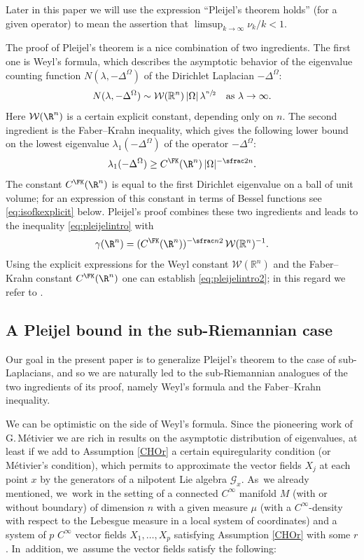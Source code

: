Later in this paper we will use the expression ``Pleijel's theorem holds'' (for a given operator) to mean the assertion that $\limsup_{k\to\infty} \nu_k/k<1$.

The proof of Pleijel's theorem is a nice combination of two ingredients. The first one is Weyl's formula, which describes the asymptotic behavior of the eigenvalue counting function $N(\lambda,-\Delta^\Omega)$ of the Dirichlet Laplacian $-\Delta^\Omega$:
\[
N(\lambda, -\Delta^\Omega) \sim \mathcal W(\mathbb R^n) \,|\Omega|\,\lambda^{\sfrac n2}
\quad\text{as}\ \lambda\to\infty.
\]
Here $\mathcal W(\R^n)$ is a certain explicit constant, depending only on $n$. The second ingredient is the Faber--Krahn inequality, which gives the following lower bound on the lowest eigenvalue $\lambda_1(-\Delta^\Omega)$ of the operator $-\Delta^\Omega$:
\[
\lambda_1(-\Delta^{\Omega}) \geq C^\FK(\R^n) \,|\Omega|^{-\sfrac 2n}.
\]
The constant $C^\FK(\R^n)$ is equal to the first Dirichlet eigenvalue on a ball of unit volume; for an expression of this constant in terms of Bessel functions see \eqref{eq:isofkexplicit} below. Pleijel's proof combines these two ingredients and leads to the inequality \eqref{eq:pleijelintro} with
\begin{equation}\label{PlConst}
\gamma (\R^n)= (C^\FK(\R^n))^{-\sfrac n2} \,\mathcal W(\mathbb R^n)^{-1}.
\end{equation}
Using the explicit expressions for the Weyl constant $\mathcal W(\mathbb R^n)$ and the Faber--Krahn constant $C^\FK(\R^n)$ one can establish \eqref{eq:pleijelintro2}; in this regard we refer to \cite[Part\,II, Lem.\,9]{BerMe}.

\subsection{A Pleijel bound in the sub-Riemannian case}
Our goal in the present paper is to generalize Pleijel's theorem to the case of sub-Laplacians, and so we are naturally led to the sub-Riemannian analogues of the two ingredients of its proof, namely Weyl's formula and the Faber--Krahn inequality.

We can be optimistic on the side of Weyl's formula. Since the pioneering work of G.\,Métivier \cite{Me} we are rich in results on the asymptotic distribution of eigenvalues, at least if we add to Assumption \ref{CHOr} a certain equiregularity condition (or Métivier's condition), which permits to approximate the vector fields $X_j$ at each point $x$ by the generators of a nilpotent Lie algebra $\mathcal G_x$. As~we already mentioned, we~work in the setting of a connected $C^\infty$ manifold $M$ (with or without boundary) of dimension $n$ with a given measure $\mu$ (with a $C^\infty$-density with respect to the Lebesgue measure in a local system of coordinates) and a system of $p$ $C^\infty$ vector fields $X_1,\ldots,X_p$ satisfying Assumption \ref{CHOr} with some $r$. In~addition, we~assume the vector fields satisfy the following:

